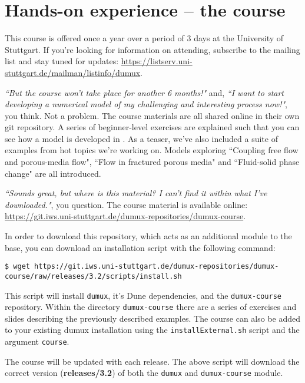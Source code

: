 \section{Hands-on \Dumux experience -- the \Dumux course}
This course is offered once a year over a period of 3 days at the University of Stuttgart.
If you're looking for information on attending, subscribe to the \Dumux mailing list
and stay tuned for updates:
\url{https://listserv.uni-stuttgart.de/mailman/listinfo/dumux}. \par
%
\textit{``But the course won't take place for another 6 months!"} and,
\textit{``I want to start developing a numerical model of my challenging and
  interesting process now!"}, you think.
Not a problem. The course materials are all shared online in their own
git repository. A series of beginner-level exercises are explained
such that you can see how a model is developed in \Dumux. As a teaser, we've
 also included a suite of examples from hot topics we're working on. Models
  exploring ``Coupling free flow and porous-media flow", ``Flow in fractured
   porous media" and ``Fluid-solid phase change" are all introduced.  \par
\textit{``Sounds great, but where is this material? I can't find it within
what I've downloaded."}, you question.
The \Dumux course material is available online:
\url{https://git.iws.uni-stuttgart.de/dumux-repositories/dumux-course}. \par
In order to download this repository, which acts as an additional module to
the \Dumux base, you can download an installation script with the following command:
\begin{lstlisting}[style=Bash]
$ wget https://git.iws.uni-stuttgart.de/dumux-repositories/dumux-course/raw/releases/3.2/scripts/install.sh
\end{lstlisting}
This script will install \texttt{dumux}, it's Dune dependencies, and the \texttt{dumux-course}
repository. Within the directory \texttt{dumux-course} there are a series of exercises
and slides describing the previously described examples. The course can also be added to your existing 
dumux installation using the \texttt{installExternal.sh} script and the argument \texttt{course}.\par
%
The \Dumux course will be updated with each \Dumux release.
The above script will download the correct version (\textbf{releases/3.2}) of both
the \texttt{dumux} and \texttt{dumux-course} module.
